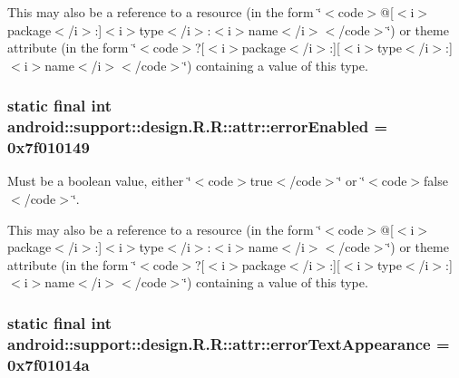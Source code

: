This may also be a reference to a resource (in the form \char`\"{}$<$code$>$@\mbox{[}$<$i$>$package$<$/i$>$:\mbox{]}$<$i$>$type$<$/i$>$:$<$i$>$name$<$/i$>$$<$/code$>$\char`\"{}) or theme attribute (in the form \char`\"{}$<$code$>$?\mbox{[}$<$i$>$package$<$/i$>$:\mbox{]}\mbox{[}$<$i$>$type$<$/i$>$:\mbox{]}$<$i$>$name$<$/i$>$$<$/code$>$\char`\"{}) containing a value of this type. \hypertarget{classandroid_1_1support_1_1design_1_1_r_1_1attr_1f574b7ae90a5781eb4837135be770e9}{
\subsubsection[{errorEnabled}]{\setlength{\rightskip}{0pt plus 5cm}static final int android::support::design.R.R::attr::errorEnabled = 0x7f010149}}
\label{classandroid_1_1support_1_1design_1_1_r_1_1attr_1f574b7ae90a5781eb4837135be770e9}


Must be a boolean value, either \char`\"{}$<$code$>$true$<$/code$>$\char`\"{} or \char`\"{}$<$code$>$false$<$/code$>$\char`\"{}. 

This may also be a reference to a resource (in the form \char`\"{}$<$code$>$@\mbox{[}$<$i$>$package$<$/i$>$:\mbox{]}$<$i$>$type$<$/i$>$:$<$i$>$name$<$/i$>$$<$/code$>$\char`\"{}) or theme attribute (in the form \char`\"{}$<$code$>$?\mbox{[}$<$i$>$package$<$/i$>$:\mbox{]}\mbox{[}$<$i$>$type$<$/i$>$:\mbox{]}$<$i$>$name$<$/i$>$$<$/code$>$\char`\"{}) containing a value of this type. \hypertarget{classandroid_1_1support_1_1design_1_1_r_1_1attr_b3417467f4ed26dc59128c91f5c4650f}{
\subsubsection[{errorTextAppearance}]{\setlength{\rightskip}{0pt plus 5cm}static final int android::support::design.R.R::attr::errorTextAppearance = 0x7f01014a}}
\label{classandroid_1_1support_1_1design_1_1_r_1_1attr_b3417467f4ed26dc59128c91f5c4650f}


